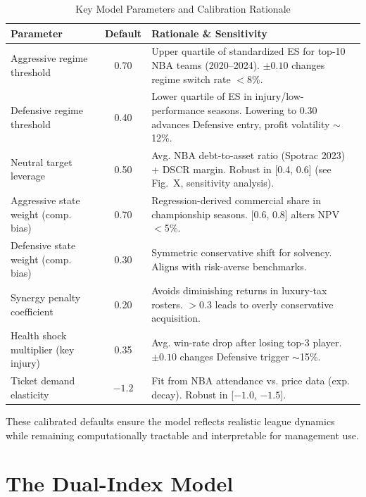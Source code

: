\documentclass{mcmthesis}
\begin{document}
\begin{table}[htbp]
\centering
\small %
\setlength{\tabcolsep}{5pt} %
\renewcommand{\arraystretch}{1.05} %
\caption{Key Model Parameters and Calibration Rationale}
\label{tab:parameters}
\begin{tabular}{l c p{9.5cm}}
\toprule
\textbf{Parameter} & \textbf{Default} & \textbf{Rationale \& Sensitivity} \\
\midrule
Aggressive regime threshold & 0.70 & Upper quartile of standardized ES for top-10 NBA teams (2020--2024). $\pm 0.10$ changes regime switch rate $<$8\%. \\
Defensive regime threshold & 0.40 & Lower quartile of ES in injury/low-performance seasons. Lowering to 0.30 advances Defensive entry, profit volatility $\sim$12\%. \\
Neutral target leverage & 0.50 & Avg. NBA debt-to-asset ratio (Spotrac 2023) + DSCR margin. Robust in [0.4, 0.6] (see Fig.~X, sensitivity analysis). \\
Aggressive state weight (comp. bias) & 0.70 & Regression-derived commercial share in championship seasons. [0.6, 0.8] alters NPV $<$5\%. \\
Defensive state weight (comp. bias) & 0.30 & Symmetric conservative shift for solvency. Aligns with risk-averse benchmarks. \\
Synergy penalty coefficient & 0.20 & Avoids diminishing returns in luxury-tax rosters. $>$0.3 leads to overly conservative acquisition. \\
Health shock multiplier (key injury) & 0.35 & Avg. win-rate drop after losing top-3 player. $\pm 0.10$ changes Defensive trigger $\sim$15\%. \\
Ticket demand elasticity & $-1.2$ & Fit from NBA attendance vs. price data (exp. decay). Robust in [$-1.0$, $-1.5$]. \\
\bottomrule
\end{tabular}
\end{table}

These calibrated defaults ensure the model reflects realistic league dynamics while remaining computationally tractable and interpretable for management use.




\section{The Dual-Index Model}
\label{sec:dual-index}
\end{document}
